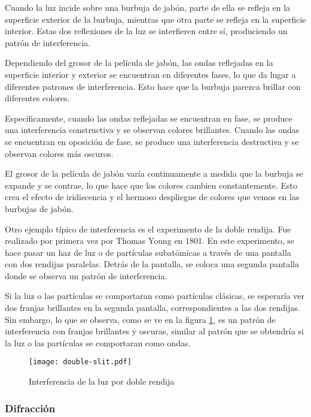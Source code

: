 Cuando la luz incide sobre una burbuja de jabón, parte de ella se refleja en la superficie exterior de la burbuja, mientras que otra parte se refleja en la superficie interior. Estas dos reflexiones de la luz se interfieren entre sí, produciendo un patrón de interferencia.

Dependiendo del grosor de la película de jabón, las ondas reflejadas en la superficie interior y exterior se encuentran en diferentes fases, lo que da lugar a diferentes patrones de interferencia. Esto hace que la burbuja parezca brillar con diferentes colores.
\clearpage

Específicamente, cuando las ondas reflejadas se encuentran en fase, se produce una interferencia constructiva y se observan colores brillantes. Cuando las ondas se encuentran en oposición de fase, se produce una interferencia destructiva y se observan colores más oscuros.

El grosor de la película de jabón varía continuamente a medida que la burbuja se expande y se contrae, lo que hace que los colores cambien constantemente. Esto crea el efecto de iridiscencia y el hermoso despliegue de colores que vemos en las burbujas de jabón.

Otro ejemplo típico de interferencia es el experimento de la doble rendija. Fue realizado por primera vez por Thomas Young en 1801. En este experimento, se hace pasar un haz de luz o de partículas subatómicas a través de una pantalla con dos rendijas paralelas. Detrás de la pantalla, se coloca una segunda pantalla donde se observa un patrón de interferencia.

Si la luz o las partículas se comportaran como partículas clásicas, se esperaría ver dos franjas brillantes en la segunda pantalla, correspondientes a las dos rendijas. Sin embargo, lo que se observa, como se ve en la figura \ref{fig:double_slit}, es un patrón de interferencia con franjas brillantes y oscuras, similar al patrón que se obtendría si la luz o las partículas se comportaran como ondas.


\begin{figure}[ht]
  \centering
  \texttt{[image: double-slit.pdf]}
  \caption{Interferencia de la luz por doble rendija}
  \label{fig:double_slit}
\end{figure}

\subsubsection{Difracción}

